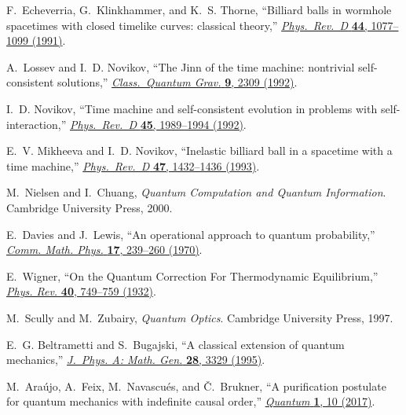 \documentclass[a4paper,onecolumn,11pt,accepted=2018-05-04]{quantumarticle}
\begin{document}
\begin{thebibliography}{10}
F.~Echeverria, G.~Klinkhammer, and K.~S. Thorne, ``{Billiard balls in wormhole
  spacetimes with closed timelike curves: classical theory},''
  \href{http://dx.doi.org/10.1103/PhysRevD.44.1077}{{\em Phys.\ Rev.\ D}
  {\bfseries 44}, 1077--1099 (1991)}.

A.~Lossev and I.~D. Novikov, ``The {Jinn} of the time machine: nontrivial
  self-consistent solutions,''
  \href{http://dx.doi.org/10.1088/0264-9381/9/10/014}{{\em Class.\ Quantum Grav.} {\bfseries 9}, 2309 (1992)}.

I.~D. Novikov, ``Time machine and self-consistent evolution in problems with
  self-interaction,'' \href{http://dx.doi.org/10.1103/PhysRevD.45.1989}{{\em
  Phys.\ Rev.\ D} {\bfseries 45}, 1989--1994 (1992)}.

E.~V. Mikheeva and I.~D. Novikov, ``Inelastic billiard ball in a spacetime with
  a time machine,'' \href{http://dx.doi.org/10.1103/PhysRevD.47.1432}{{\em
  Phys.\ Rev.\ D} {\bfseries 47}, 1432--1436 (1993)}.

M.~Nielsen and I.~Chuang, {\em Quantum Computation and Quantum Information}.
\newblock Cambridge University Press, 2000.

E.~Davies and J.~Lewis, ``An operational approach to quantum probability,''
  \href{http://dx.doi.org/10.1007/BF01647093}{{\em Comm. Math. Phys.}
  {\bfseries 17}, 239--260 (1970)}.

E.~Wigner, ``On the Quantum Correction For Thermodynamic Equilibrium,''
  \href{http://dx.doi.org/10.1103/PhysRev.40.749}{{\em Phys. Rev.} {\bfseries
  40}, 749--759 (1932)}.

M.~Scully and M.~Zubairy, {\em Quantum Optics}.
\newblock Cambridge University Press, 1997.

E.~G. Beltrametti and S.~Bugajski, ``A classical extension of quantum
  mechanics,'' \href{http://dx.doi.org/10.1088/0305-4470/28/12/007}{{\em
  J.~Phys. A: Math. Gen.} {\bfseries 28}, 3329 (1995)}.

M.~Ara{\'{u}}jo, A.~Feix, M.~Navascu{\'{e}}s, and {\v{C}}.~Brukner, ``A
  purification postulate for quantum mechanics with indefinite causal order,''
  \href{http://dx.doi.org/10.22331/q-2017-04-26-10}{{\em {Quantum}} {\bfseries
  1}, 10 (2017)}.

\end{thebibliography}%
\end{document}
